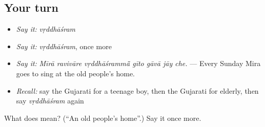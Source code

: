 \subsection*{Your turn}
\begin{itemize}
\raggedright
  \item \emph{Say it:} \emph{vṛddhāśram}
  \item \emph{Say it:} \emph{vṛddhāśram}, once more
  \item \emph{Say it:} \emph{Mīrā ravivāre vṛddhāśrammā̃ gīto gāvā jāy che.} — Every Sunday Mira goes to sing at the old people's home.
  \item \emph{Recall:} say the Gujarati for a teenage boy, then the Gujarati for elderly, then say \emph{vṛddhāśram} again
\end{itemize}

\begin{tcolorbox}[breakable,colback=teal!4,colframe=teal!35!black,title={Before you move on}]
What does  mean? (\textquotedblleft{}An old people's home\textquotedblright{}.) Say it once more.
\end{tcolorbox}
